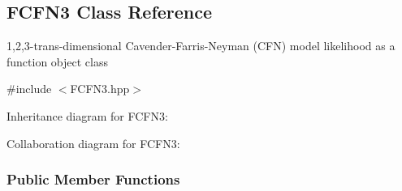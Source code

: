 \hypertarget{classFCFN3}{\subsection{\-F\-C\-F\-N3 \-Class \-Reference}
\label{classFCFN3}
}


1,2,3-\/trans-\/dimensional \-Cavender-\/\-Farris-\/\-Neyman (\-C\-F\-N) model likelihood as a function object class  




{\ttfamily \#include $<$\-F\-C\-F\-N3.\-hpp$>$}



\-Inheritance diagram for \-F\-C\-F\-N3\-:


\-Collaboration diagram for \-F\-C\-F\-N3\-:
\subsubsection*{\-Public \-Member \-Functions}
